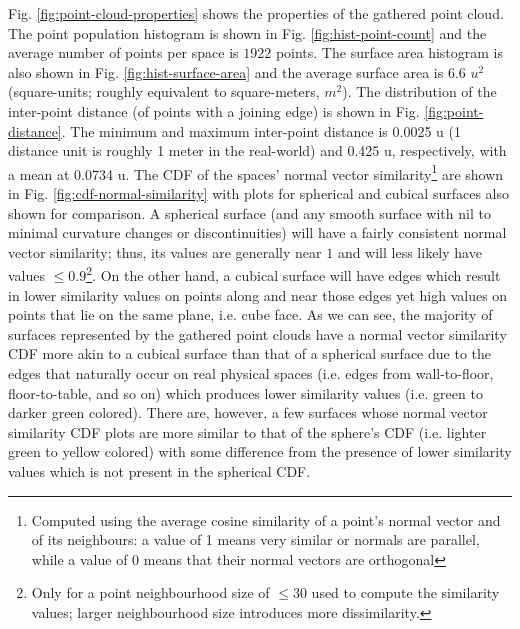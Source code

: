 \renewcommand*{\thefootnote}{\fnsymbol{footnote}}
Fig. \ref{fig:point-cloud-properties} shows the properties of the gathered point cloud. The point population histogram is shown in Fig. \ref{fig:hist-point-count} and the average number of points per space is $1922$ points. The surface area histogram is also shown in Fig. \ref{fig:hist-surface-area} and the average surface area is $6.6$ $u^2$ (square-units; roughly equivalent to square-meters, $m^2$). The distribution of the inter-point distance (of points with a joining edge) is shown in Fig. \ref{fig:point-distance}. The minimum and maximum inter-point distance is 0.0025 u (1 distance unit is roughly 1 meter in the real-world) and 0.425 u, respectively, with a mean at  0.0734 u. The CDF of the spaces' normal vector similarity\footnote[2]{Computed using the average cosine similarity of a point's normal vector and of its neighbours: a value of 1 means very similar or normals are parallel, while a value of 0 means that their normal vectors are orthogonal} are shown in Fig. \ref{fig:cdf-normal-similarity} with plots for spherical and cubical surfaces also shown for comparison. A spherical surface (and any smooth surface with nil to minimal curvature changes or discontinuities) will have a fairly consistent normal vector similarity; thus, its values are generally near $1$ and will less likely have values $\leq 0.9$\footnote[3]{Only for a point neighbourhood size of $\leq 30$ used to compute the similarity values; larger neighbourhood size introduces more dissimilarity.}. On the other hand, a cubical surface will have edges which result in lower similarity values on points along and near those edges yet high values on points that lie on the same plane, i.e. cube face. As we can see, the majority of surfaces represented by the gathered point clouds have a normal vector similarity CDF more akin to a cubical surface than that of a spherical surface due to the edges that naturally occur on real physical spaces (i.e. edges from wall-to-floor, floor-to-table, and so on) which produces lower similarity values (i.e. green to darker green colored). There are, however, a few surfaces whose normal vector similarity CDF plots are more similar to that of the sphere's CDF (i.e. lighter green to yellow colored) with some difference from the presence of lower similarity values which is not present in the spherical CDF.
\renewcommand*{\thefootnote}{\arabic{footnote}}

